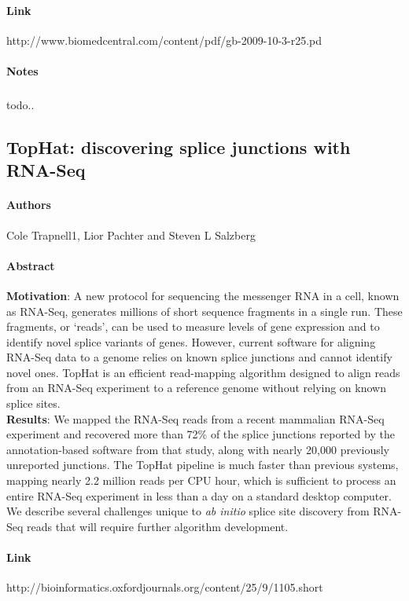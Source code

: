 \documentclass{article}
\begin{document}
			\paragraph{Link\\}  http://www.biomedcentral.com/content/pdf/gb-2009-10-3-r25.pd
			\paragraph{Notes}
				\subparagraph{} todo..
		\subsection{TopHat: discovering splice junctions with RNA-Seq}
			\paragraph{Authors\\} Cole Trapnell1, Lior Pachter and Steven L Salzberg
			\paragraph{Abstract\\} \textbf{Motivation}: A new protocol for sequencing the messenger RNA in a cell, known as RNA-Seq, generates millions of short sequence fragments in a single run. These fragments, or ‘reads’, can be used to measure levels of gene expression and to identify novel splice variants of genes. However, current software for aligning RNA-Seq data to a genome relies on known splice junctions and cannot identify	novel ones. TopHat is an efficient read-mapping algorithm designed to align reads from an RNA-Seq experiment to a reference genome without relying on known splice sites.\\
			\textbf{Results}: We mapped the RNA-Seq reads from a recent mammalian
			RNA-Seq experiment and recovered more than 72\% of the splice junctions reported by the annotation-based software from that study, along with nearly 20,000 previously unreported junctions. The TopHat pipeline is much faster than previous systems, mapping nearly 2.2 million reads per CPU hour, which is sufficient to process an entire RNA-Seq experiment in less than a day on a standard desktop computer. We describe several challenges unique to \textit{ab initio} splice site discovery from RNA-Seq reads that will require further algorithm development.
			\paragraph{Link\\} http://bioinformatics.oxfordjournals.org/content/25/9/1105.short
\end{document}
